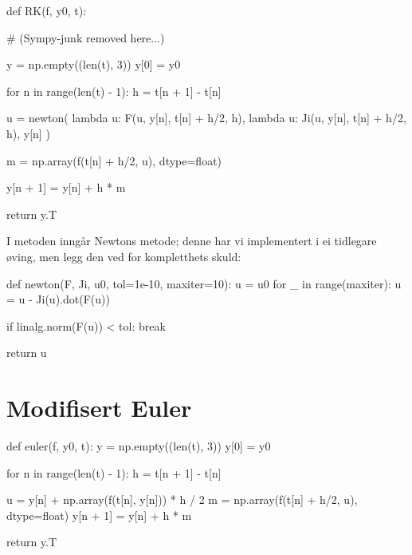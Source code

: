 \documentclass[12pt]{article}
\begin{document}
\begin{appendices}
    \noindent\begin{minipage}{\linewidth}
    \begin{python}[caption={Implisitt Runge-Kutta midtpunktmetode.}]
def RK(f, y0, t):

    # (Sympy-junk removed here...)

    y = np.empty((len(t), 3))
    y[0] = y0

    for n in range(len(t) - 1):
        h = t[n + 1] - t[n]

        u = newton(
            lambda u:  F(u, y[n], t[n] + h/2, h),
            lambda u: Ji(u, y[n], t[n] + h/2, h),
            y[n]
        )

        m = np.array(f(t[n] + h/2, u), dtype=float)

        y[n + 1] = y[n] + h * m

    return y.T
    \end{python}
    \end{minipage}
    I metoden inngår Newtons metode;
    denne har vi implementert i ei tidlegare øving,
    men legg den ved for kompletthets skuld:

    \noindent\begin{minipage}{\linewidth}
    \begin{python}[caption={Newtons metode frå tidlegare øving.}]
def newton(F, Ji, u0, tol=1e-10, maxiter=10):
    u = u0
    for _ in range(maxiter):
        u = u - Ji(u).dot(F(u))

        if linalg.norm(F(u)) < tol:
            break

    return u
    \end{python}
    \end{minipage}

    \section{Modifisert Euler} \label{a_euler}
    \noindent\begin{minipage}{\linewidth}
        \begin{python}[caption={Modifisert Eulers metode (eksplisitt)}]
def euler(f, y0, t):
    y = np.empty((len(t), 3))
    y[0] = y0

    for n in range(len(t) - 1):
        h = t[n + 1] - t[n]

        u = y[n] + np.array(f(t[n], y[n])) * h / 2
        m = np.array(f(t[n] + h/2, u), dtype=float)
        y[n + 1] = y[n] + h * m

    return y.T
    \end{python}
    \end{minipage}

\end{appendices}
\end{document}
